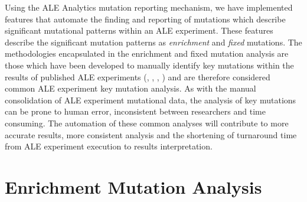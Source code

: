 \documentclass[12pt,final,masters,chapterheads]{ucsd}  %
\begin{document}
Using the ALE Analytics mutation reporting mechanism, we have implemented features that automate the finding and reporting of mutations which describe significant mutational patterns within an ALE experiment. These features describe the significant mutation patterns as \textit{enrichment} and \textit{fixed} mutations. The methodologies encapsulated in the enrichment and fixed mutation analysis are those which have been developed to manually identify key mutations within the results of published ALE experiments (\cite{10.1371/journal.pgen.1001186}, \cite{pmid25015645}, \cite{pmid26964043}, \cite{pmid25304508}) and are therefore considered common ALE experiment key mutation analysis. As with the manual consolidation of ALE experiment mutational data, the analysis of key mutations can be prone to human error, inconsistent between researchers and time consuming. The automation of these common analyses will contribute to more accurate results, more consistent analysis and the shortening of turnaround time from ALE experiment execution to results interpretation.

%
%

\section{Enrichment Mutation Analysis}

%
%

%
%

%
%
\end{document}
